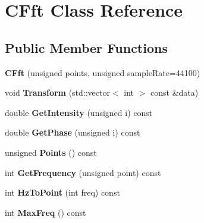\hypertarget{class_c_fft}{\section{C\-Fft Class Reference}
\label{class_c_fft}
}
\subsection*{Public Member Functions}
\begin{DoxyCompactItemize}
\item 
\hypertarget{class_c_fft_a63b7e3623a7b44fe261fc35a508611bd}{{\bfseries C\-Fft} (unsigned points, unsigned sample\-Rate=44100)}\label{class_c_fft_a63b7e3623a7b44fe261fc35a508611bd}

\item 
\hypertarget{class_c_fft_a25c33d7e3a1bb2a86759bd63f52f1068}{void {\bfseries Transform} (std\-::vector$<$ int $>$ const \&data)}\label{class_c_fft_a25c33d7e3a1bb2a86759bd63f52f1068}

\item 
\hypertarget{class_c_fft_a340ad19a942ea256544c15edefe6c3e5}{double {\bfseries Get\-Intensity} (unsigned i) const }\label{class_c_fft_a340ad19a942ea256544c15edefe6c3e5}

\item 
\hypertarget{class_c_fft_a9dcb94892c6f73328c780d9fdc52f923}{double {\bfseries Get\-Phase} (unsigned i) const }\label{class_c_fft_a9dcb94892c6f73328c780d9fdc52f923}

\item 
\hypertarget{class_c_fft_ab5a5a1a8b5d6f559d70ad88615b4129c}{unsigned {\bfseries Points} () const }\label{class_c_fft_ab5a5a1a8b5d6f559d70ad88615b4129c}

\item 
\hypertarget{class_c_fft_a48871390b105bd874fa824925dfa3c08}{int {\bfseries Get\-Frequency} (unsigned point) const }\label{class_c_fft_a48871390b105bd874fa824925dfa3c08}

\item 
\hypertarget{class_c_fft_abe38db44b3cd18377001daaec3df2df2}{int {\bfseries Hz\-To\-Point} (int freq) const }\label{class_c_fft_abe38db44b3cd18377001daaec3df2df2}

\item 
\hypertarget{class_c_fft_a18b1b0d7270d0353423521854916b805}{int {\bfseries Max\-Freq} () const }\label{class_c_fft_a18b1b0d7270d0353423521854916b805}

\end{DoxyCompactItemize}
